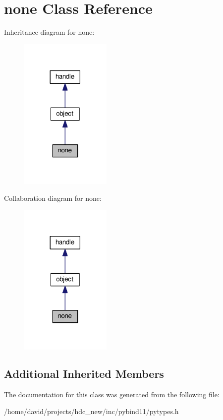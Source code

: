 \hypertarget{classnone}{}\section{none Class Reference}
\label{classnone}


Inheritance diagram for none\+:
\nopagebreak
\begin{figure}[H]
\begin{center}
\leavevmode
\includegraphics[width=125pt]{classnone__inherit__graph}
\end{center}
\end{figure}


Collaboration diagram for none\+:
\nopagebreak
\begin{figure}[H]
\begin{center}
\leavevmode
\includegraphics[width=125pt]{classnone__coll__graph}
\end{center}
\end{figure}
\subsection*{Additional Inherited Members}


The documentation for this class was generated from the following file\+:\begin{DoxyCompactItemize}
\item 
/home/david/projects/hdc\+\_\+new/inc/pybind11/pytypes.\+h\end{DoxyCompactItemize}
